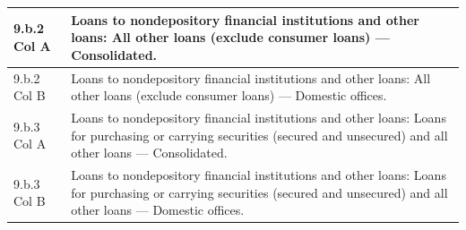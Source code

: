 \documentclass[conference]{IEEEtran}
\begin{document}
\begin{table}[htbp]
\begin{tabular}{|p{3cm}|p{12cm}|}
		\hline
		9.b.2 Col A & Loans to nondepository financial institutions and other loans: All other loans (exclude consumer loans) — Consolidated. \\
		\hline
		9.b.2 Col B & Loans to nondepository financial institutions and other loans: All other loans (exclude consumer loans) — Domestic offices. \\
		\hline
		9.b.3 Col A & Loans to nondepository financial institutions and other loans: Loans for purchasing or carrying securities (secured and unsecured) and all other loans — Consolidated. \\
		\hline
		9.b.3 Col B & Loans to nondepository financial institutions and other loans: Loans for purchasing or carrying securities (secured and unsecured) and all other loans — Domestic offices. \\
		\hline
	\end{tabular}
\end{table}
\end{document}
